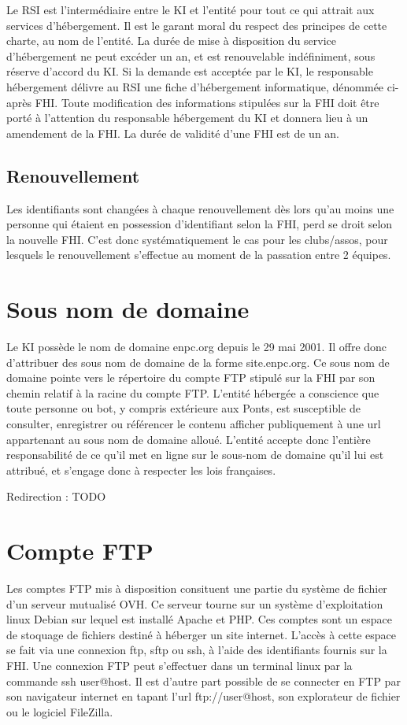 \documentclass{charteki019}
\begin{document}
Le RSI est l'intermédiaire entre le KI et l'entité pour tout ce qui attrait aux services d'hébergement. Il est le garant moral du respect des principes de cette charte, au nom de l'entité. La durée de mise à disposition du service d'hébergement ne peut excéder un an, et est renouvelable indéfiniment, sous réserve d'accord du KI.
Si la demande est acceptée par le KI, le responsable hébergement délivre au RSI une fiche d'hébergement informatique, dénommée ci-après FHI. Toute modification des informations stipulées sur la FHI doit être porté à l'attention du responsable hébergement du KI et donnera lieu à un amendement de la FHI. La durée de validité d'une FHI est de un an.

\subsection{Renouvellement}

Les identifiants sont changées à chaque renouvellement dès lors qu'au moins une personne qui étaient en possession d'identifiant selon la FHI, perd se droit selon la nouvelle FHI. C'est donc systématiquement le cas pour les clubs/assos, pour lesquels le renouvellement s'effectue au moment de la passation entre 2 équipes. 

\section{Sous nom de domaine}

Le KI possède le nom de domaine enpc.org depuis le 29 mai 2001. Il offre donc d'attribuer des sous nom de domaine de la forme site.enpc.org. Ce sous nom de domaine pointe vers le répertoire du compte FTP stipulé sur la FHI par son chemin relatif à la racine du compte FTP.
L'entité hébergée a conscience que toute personne ou bot, y compris extérieure aux Ponts, est susceptible de consulter, enregistrer ou référencer le contenu afficher publiquement à une url appartenant au sous nom de domaine alloué. L'entité accepte donc l'entière responsabilité de ce qu'il met en ligne sur le sous-nom de domaine qu'il lui est attribué, et s'engage donc à respecter les lois françaises.

Redirection : TODO

\section{Compte FTP}

Les comptes FTP mis à disposition consituent une partie du système de fichier d'un serveur mutualisé OVH. Ce serveur tourne sur un système d'exploitation linux Debian sur lequel est installé Apache et PHP. Ces comptes sont un espace de stoquage de fichiers destiné à héberger un site internet. L'accès à cette espace se fait via une connexion ftp, sftp ou ssh, à l'aide des identifiants fournis sur la FHI. Une connexion FTP peut s'effectuer dans un terminal linux par la commande ssh user@host. Il est d'autre part possible de se connecter en FTP par son navigateur internet en tapant l'url ftp://user@host, son explorateur de fichier ou le logiciel FileZilla.
\end{document}
